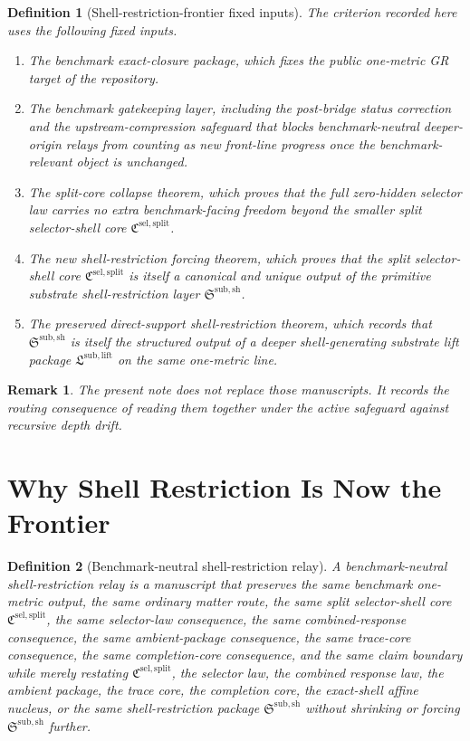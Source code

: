 \documentclass[11pt]{article}
\newcommand{\SelectorCore}{\mathfrak C^{\mathrm{sel,split}}}
\newcommand{\ShellRestriction}{\mathfrak S^{\mathrm{sub,sh}}}
\newcommand{\LiftPackage}{\mathfrak L^{\mathrm{sub,lift}}}
\newtheorem{definition}{Definition}
\newtheorem{remark}{Remark}
\begin{document}
\begin{definition}[Shell-restriction-frontier fixed inputs]
The criterion recorded here uses the following fixed inputs.
\begin{enumerate}
    \item The benchmark exact-closure package, which fixes the public one-metric GR target of the repository.
    \item The benchmark gatekeeping layer, including the post-bridge status correction and the upstream-compression safeguard that blocks benchmark-neutral deeper-origin relays from counting as new front-line progress once the benchmark-relevant object is unchanged.
    \item The split-core collapse theorem, which proves that the full zero-hidden selector law carries no extra benchmark-facing freedom beyond the smaller split selector-shell core \(\SelectorCore\).
    \item The new shell-restriction forcing theorem, which proves that the split selector-shell core \(\SelectorCore\) is itself a canonical and unique output of the primitive substrate shell-restriction layer \(\ShellRestriction\).
    \item The preserved direct-support shell-restriction theorem, which records that \(\ShellRestriction\) is itself the structured output of a deeper shell-generating substrate lift package \(\LiftPackage\) on the same one-metric line.
\end{enumerate}
\end{definition}

\begin{remark}
The present note does not replace those manuscripts. It records the routing consequence of reading them together under the active safeguard against recursive depth drift.
\end{remark}

\section{Why Shell Restriction Is Now the Frontier}

\begin{definition}[Benchmark-neutral shell-restriction relay]
A \emph{benchmark-neutral shell-restriction relay} is a manuscript that preserves the same benchmark one-metric output, the same ordinary matter route, the same split selector-shell core \(\SelectorCore\), the same selector-law consequence, the same combined-response consequence, the same ambient-package consequence, the same trace-core consequence, the same completion-core consequence, and the same claim boundary while merely restating \(\SelectorCore\), the selector law, the combined response law, the ambient package, the trace core, the completion core, the exact-shell affine nucleus, or the same shell-restriction package \(\ShellRestriction\) without shrinking or forcing \(\ShellRestriction\) further.
\end{definition}
\end{document}
